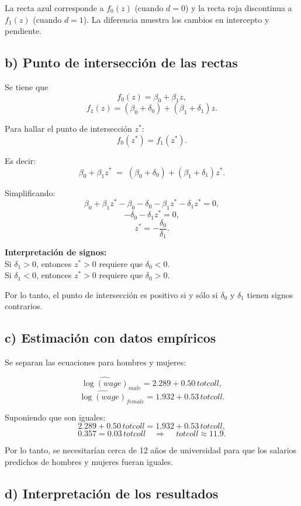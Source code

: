 \documentclass[12pt]{article}
\begin{document}
La recta azul corresponde a $f_{0}(z)$ (cuando $d=0$) y la recta roja discontinua a $f_{1}(z)$ (cuando $d=1$). La diferencia muestra los cambios en intercepto y pendiente.

\subsection*{b) Punto de intersección de las rectas}

Se tiene que
\[
f_{0}(z) = \beta_{0} + \beta_{1}z,
\]
\[
f_{1}(z) = (\beta_{0} + \delta_{0}) + (\beta_{1} + \delta_{1})z.
\]

Para hallar el punto de intersección $z^{*}$:
\[
f_{0}(z^{*}) = f_{1}(z^{*}).
\]

Es decir:
\[
\beta_{0} + \beta_{1}z^{*} \;=\; (\beta_{0} + \delta_{0}) + (\beta_{1} + \delta_{1})z^{*}.
\]

Simplificando:
\[
\beta_{0} + \beta_{1}z^{*} - \beta_{0} - \delta_{0} - \beta_{1}z^{*} - \delta_{1}z^{*} = 0,
\]
\[
- \delta_{0} - \delta_{1}z^{*} = 0,
\]
\[
z^{*} = - \frac{\delta_{0}}{\delta_{1}}.
\]

\noindent
\textbf{Interpretación de signos:}\\  
Si $\delta_{1} > 0$, entonces $z^{*} > 0$ requiere que $\delta_{0} < 0$.\\  
Si $\delta_{1} < 0$, entonces $z^{*} > 0$ requiere que $\delta_{0} > 0$.  

Por lo tanto, el punto de intersección es positivo si y sólo si $\delta_{0}$ y $\delta_{1}$ tienen signos contrarios.

\subsection*{c) Estimación con datos empíricos}

Se separan las ecuaciones para hombres y mujeres:

\[
\widehat{\log(wage)}_{male} = 2.289 + 0.50 \, totcoll,
\]
\[
\widehat{\log(wage)}_{female} = 1.932 + 0.53 \, totcoll.
\]

Suponiendo que son iguales:
\[
2.289 + 0.50\, totcoll = 1.932 + 0.53\, totcoll,
\]
\[
0.357 = 0.03\, totcoll \quad \Rightarrow \quad \, totcoll \approx 11.9.
\]

Por lo tanto, se necesitarían cerca de 12 años de universidad para que los salarios predichos de hombres y mujeres fueran iguales.

\subsection*{d) Interpretación de los resultados}
\end{document}
